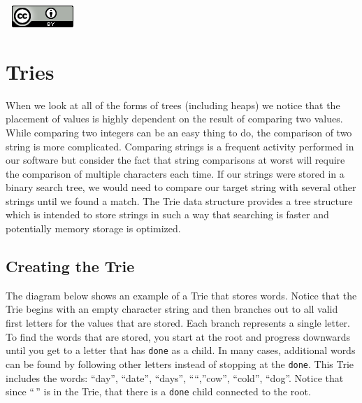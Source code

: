 \documentclass[
]{book}
\begin{document}
\(\nonumber\)
\(\nonumber\)
\href{http://creativecommons.org/licenses/by/4.0/}{\includegraphics{images/cc-88x31.png}}

\hypertarget{tries}{%
\chapter{Tries}\label{tries}}

When we look at all of the forms of trees (including heaps) we notice that the placement of values is highly dependent on the result of comparing two values. While comparing two integers can be an easy thing to do, the comparison of two string is more complicated. Comparing strings is a frequent activity performed in our software but consider the fact that string comparisons at worst will require the comparison of multiple characters each time. If our strings were stored in a binary search tree, we would need to compare our target string with several other strings until we found a match. The Trie data structure provides a tree structure which is intended to store strings in such a way that searching is faster and potentially memory storage is optimized.

\hypertarget{creating-the-trie}{%
\section{Creating the Trie}\label{creating-the-trie}}

The diagram below shows an example of a Trie that stores words. Notice that the Trie begins with an empty character string and then branches out to all valid first letters for the values that are stored. Each branch represents a single letter. To find the words that are stored, you start at the root and progress downwards until you get to a letter that has \texttt{done} as a child. In many cases, additional words can be found by following other letters instead of stopping at the \texttt{done}. This Trie includes the words: ``day'', ``date'', ``days'', ````,''cow'', ``cold'', ``dog''. Notice that since ``\,'' is in the Trie, that there is a \texttt{done} child connected to the root.
\end{document}
